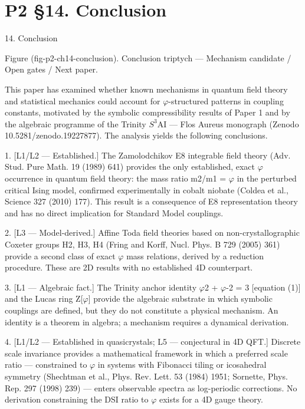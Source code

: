 
\section{P2 §14. Conclusion}

14. Conclusion

  Figure (fig-p2-ch14-conclusion). Conclusion triptych --- Mechanism candidate / Open gates / Next
                                               paper.

  This paper has examined whether known mechanisms in quantum field theory and
  statistical mechanics could account for $\varphi$-structured patterns in coupling constants,
  motivated by the symbolic compressibility results of Paper 1 and by the algebraic
  programme      of  the   Trinity  $S^{3}$AI   ---    Flos    Aureus   monograph    (Zenodo
  10.5281/zenodo.19227877). The analysis yields the following conclusions.

  1. [L1/L2 --- Established.] The Zamolodchikov E8 integrable field theory (Adv. Stud.
  Pure Math. 19 (1989) 641) provides the only established, exact $\varphi$ occurrence in
  quantum field theory: the mass ratio m2/m1 = $\varphi$ in the perturbed critical Ising model,
  confirmed experimentally in cobalt niobate (Coldea et al., Science 327 (2010) 177). This
  result is a consequence of E8 representation theory and has no direct implication for
  Standard Model couplings.

  2. [L3 --- Model-derived.] Affine Toda field theories based on non-crystallographic
  Coxeter groups H2, H3, H4 (Fring and Korff, Nucl. Phys. B 729 (2005) 361) provide a
  second class of exact $\varphi$ mass relations, derived by a reduction procedure. These are 2D
  results with no established 4D counterpart.

  3. [L1 --- Algebraic fact.] The Trinity anchor identity $\varphi$2 + $\varphi$-2 = 3 [equation (1)] and the
  Lucas ring Z[$\varphi$] provide the algebraic substrate in which symbolic couplings are
  defined, but they do not constitute a physical mechanism. An identity is a theorem in
  algebra; a mechanism requires a dynamical derivation.

  4. [L1/L2 --- Established in quasicrystals; L5 --- conjectural in 4D QFT.] Discrete scale
  invariance provides a mathematical framework in which a preferred scale ratio ---
  constrained to $\varphi$ in systems with Fibonacci tiling or icosahedral symmetry (Shechtman
  et al., Phys. Rev. Lett. 53 (1984) 1951; Sornette, Phys. Rep. 297 (1998) 239) --- enters
  observable spectra as log-periodic corrections. No derivation constraining the DSI ratio
  to $\varphi$ exists for a 4D gauge theory.

